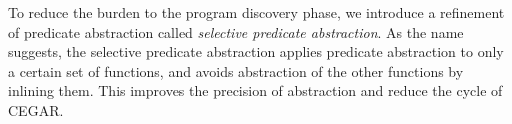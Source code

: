 \begin{enumerate}
To reduce the burden to the program discovery phase, we introduce a refinement
of predicate abstraction called \emph{selective predicate abstraction}.
As the name suggests, the selective predicate abstraction applies
predicate abstraction to only a certain set of functions, and avoids
abstraction of the other functions by inlining them.
This improves the precision of abstraction and reduce the cycle of CEGAR.



\end{enumerate}
